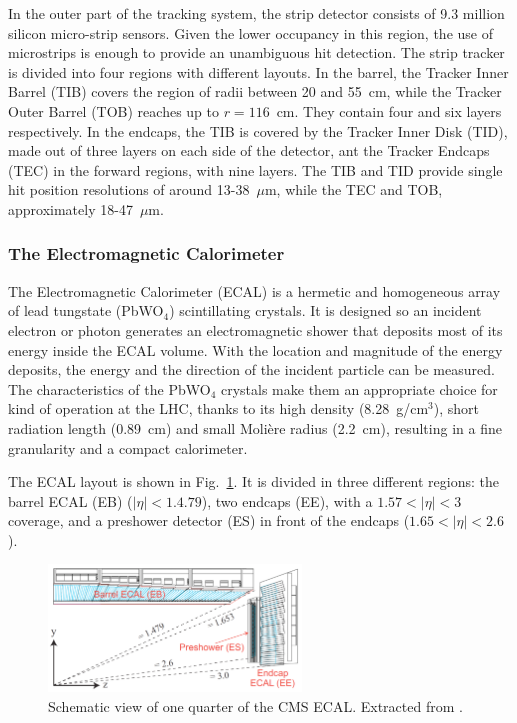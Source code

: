 \documentclass[../main.tex]{subfiles}
\begin{document}
In the outer part of the tracking system, the strip detector consists of 9.3 million silicon micro-strip sensors. Given the lower occupancy in this region, the use of microstrips is enough to provide an unambiguous hit detection. The strip tracker is divided into four regions with different layouts. In the barrel, the Tracker Inner Barrel (TIB) covers the region of radii between 20 and 55~cm, while the Tracker Outer Barrel (TOB) reaches up to $r=116$~cm. They contain four and six layers respectively. In the endcaps, the TIB is covered by the Tracker Inner Disk (TID), made out of three layers on each side of the detector, ant the Tracker Endcaps (TEC) in the forward regions, with nine layers. The TIB and TID provide single hit position resolutions of around 13-38~$\mu$m, while the TEC and TOB, approximately 18-47~$\mu$m.


\subsubsection{The Electromagnetic Calorimeter}

The Electromagnetic Calorimeter (ECAL) \cite{intro:exp:ecal} is a hermetic and homogeneous array of lead tungstate (PbWO${}_4$) scintillating crystals. It is designed so an incident electron or photon generates an electromagnetic shower that deposits most of its energy inside the ECAL volume.  With the location and magnitude of the energy deposits, the energy and the direction of the incident particle can be measured. The characteristics of the PbWO${}_4$ crystals make them an appropriate choice for kind of operation at the LHC, thanks to its high density (8.28~g/cm${}^{3}$), short radiation length (0.89~cm) and small Molière radius (2.2~cm), resulting in a fine granularity and a compact calorimeter.

The ECAL layout is shown in Fig.~\ref{intro:fig:ecal}. It is divided in three different regions: the barrel ECAL (EB) ($|\eta|<1.4.79$), two endcaps (EE), with a  $1.57 < |\eta|<3$ coverage, and a preshower detector (ES) in front of the endcaps ($1.65 < |\eta| < 2.6$).


\begin{figure}[h!]
\begin{center}
\includegraphics[width=0.6\textwidth]{Images/ecal}
\end{center}
\caption[CMS ECAL structure]{Schematic view of one quarter of the CMS ECAL. Extracted from \cite{intro:exp:ecal_layout}.}
\label{intro:fig:ecal}
\end{figure}
\end{document}
